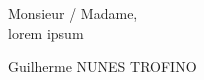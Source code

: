 \documentclass[10pt, a4paper]{extarticle}
\author{Guilherme Nunes Trofino}
\begin{document}
\maketitle

\noindent Monsieur / Madame,\\

\noindent lorem ipsum
\vspace{10mm}

\hfill Guilherme NUNES TROFINO

\vfill
{\color{\cvcolor}\titlerule[0.5mm]}
\end{document}
